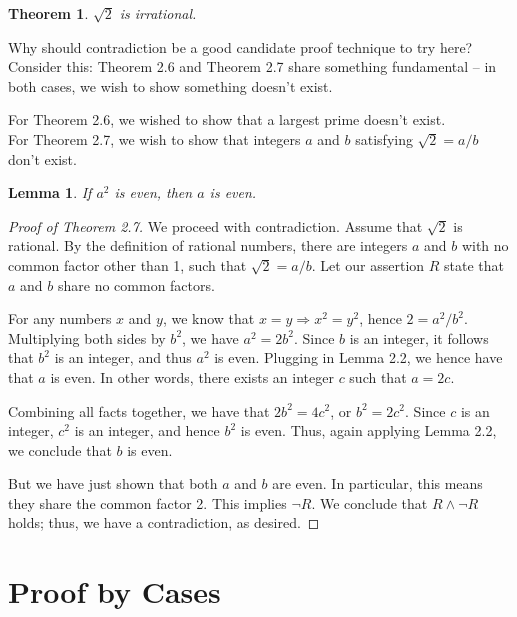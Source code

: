 \documentclass[12pt,a4paper]{article}
\newtheorem{theorem}{Theorem}[section]
\newtheorem{lemma}{Lemma}[section]
\theoremstyle{definition}
\begin{document}
\begin{theorem}\label{thm2.7}
$\sqrt{2}$ is irrational.
\end{theorem}

Why should contradiction be a good candidate proof technique to try here? Consider this: Theorem 2.6 and Theorem 2.7 share something fundamental -- in both cases, we wish to show something doesn't exist.

\bigbreak

For Theorem 2.6, we wished to show that a largest prime doesn't exist. \\
For Theorem 2.7, we wish to show that integers $a$ and $b$ satisfying $\sqrt{2}=a/b$ don't exist.

\begin{lemma}\label{lemma2.2}
If $a^2$ is even, then $a$ is even.
\end{lemma}

\begin{proof}[Proof of Theorem 2.7]
We proceed with contradiction. Assume that $\sqrt{2}$ is rational. By the definition of rational numbers, there are integers $a$ and $b$ with no common factor other than 1, such that $\sqrt{2}=a/b$. Let our assertion $R$ state that $a$ and $b$ share no common factors.

\bigbreak

For any numbers $x$ and $y$, we know that $x=y\Rightarrow x^2=y^2$, hence $2=a^2/b^2$. Multiplying both sides by $b^2$, we have $a^2=2b^2$. Since $b$ is an integer, it follows that $b^2$ is an integer, and thus $a^2$ is even. Plugging in Lemma 2.2, we hence have that $a$ is even. In other words, there exists an integer $c$ such that $a=2c$.

\bigbreak

Combining all facts together, we have that $2b^2=4c^2$, or $b^2=2c^2$. Since $c$ is an integer, $c^2$ is an integer, and hence $b^2$ is even. Thus, again applying Lemma 2.2, we conclude that $b$ is even.

\bigbreak

But we have just shown that both $a$ and $b$ are even. In particular, this means they share the common factor 2. This implies $\neg R$. We conclude that $R\wedge\neg R$ holds; thus, we have a contradiction, as desired.
\end{proof}

\section*{Proof by Cases}
\end{document}
